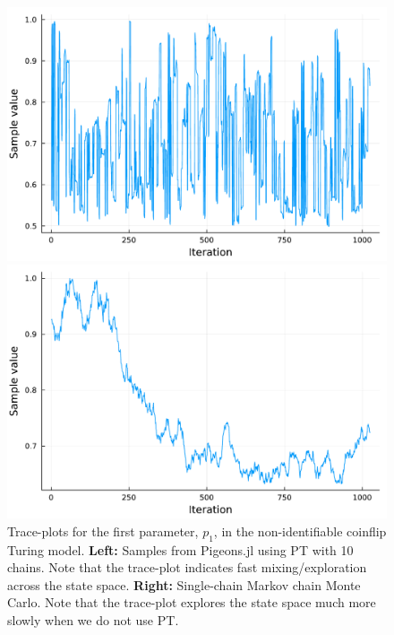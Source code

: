 \begin{figure}[t]
    \centering
    \begin{minipage}{0.45\textwidth}
      \centering
      \includegraphics[width=\textwidth]{../img/trace_density_plots_pt.pdf}
    \end{minipage}
    \begin{minipage}{0.45\textwidth}
      \centering
      \includegraphics[width=\textwidth]{../img/trace_density_plots_single_chain.pdf}
    \end{minipage}
    \caption{
        Trace-plots for the first parameter, $p_1$, in the 
        non-identifiable coinflip Turing model.
        \textbf{Left:} Samples from Pigeons.jl using PT with 10 chains. Note that the 
        trace-plot indicates fast mixing/exploration across the state space.
        \textbf{Right:} Single-chain Markov chain Monte Carlo. Note that the 
        trace-plot explores the state space much more slowly when we do not use PT.
    }
    \label{fig:trace_density_plots}
\end{figure}

